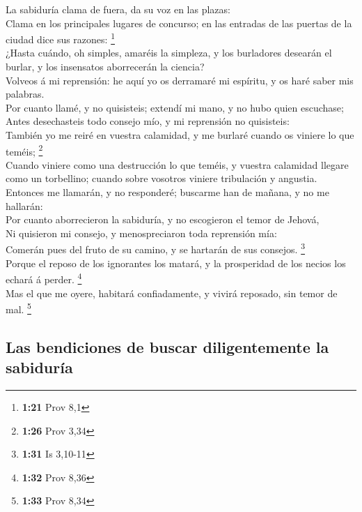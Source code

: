  La sabiduría clama de fuera, da su voz en las plazas:\\
 Clama en los principales lugares de concurso; en las
entradas de las puertas de la ciudad dice sus razones: \footnote{\textbf{1:21}
  Prov 8,1}\\
 ¿Hasta cuándo, oh simples, amaréis la simpleza, y los
burladores desearán el burlar, y los insensatos aborrecerán la
ciencia?\\
 Volveos á mi reprensión: he aquí yo os derramaré mi
espíritu, y os haré saber mis palabras.\\
 Por cuanto llamé, y no quisisteis; extendí mi mano, y no
hubo quien escuchase;\\
 Antes desechasteis todo consejo mío, y mi reprensión no
quisisteis:\\
 También yo me reiré en vuestra calamidad, y me burlaré
cuando os viniere lo que teméis; \footnote{\textbf{1:26} Prov 3,34}\\
 Cuando viniere como una destrucción lo que teméis, y
vuestra calamidad llegare como un torbellino; cuando sobre vosotros
viniere tribulación y angustia.\\
 Entonces me llamarán, y no responderé; buscarme han de
mañana, y no me hallarán:\\
 Por cuanto aborrecieron la sabiduría, y no escogieron el
temor de Jehová,\\
 Ni quisieron mi consejo, y menospreciaron toda reprensión
mía:\\
 Comerán pues del fruto de su camino, y se hartarán de sus
consejos. \footnote{\textbf{1:31} Is 3,10-11}\\
 Porque el reposo de los ignorantes los matará, y la
prosperidad de los necios los echará á perder. \footnote{\textbf{1:32}
  Prov 8,36}\\
 Mas el que me oyere, habitará confiadamente, y vivirá
reposado, sin temor de mal. \footnote{\textbf{1:33} Prov 8,34}

\hypertarget{las-bendiciones-de-buscar-diligentemente-la-sabiduruxeda}{%
\subsection{Las bendiciones de buscar diligentemente la
sabiduría}\label{las-bendiciones-de-buscar-diligentemente-la-sabiduruxeda}}


